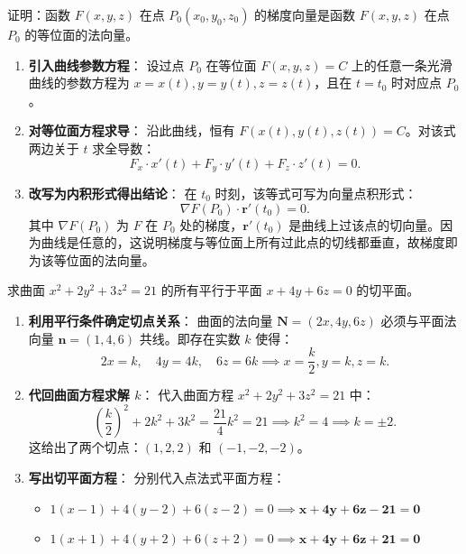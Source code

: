 \documentclass[lang=cn,11pt]{elegantbook}
\begin{document}

\begin{exercise}
证明：函数 $F(x,y,z)$ 在点 $P_0(x_0,y_0,z_0)$ 的梯度向量是函数 $F(x,y,z)$ 在点 $P_0$ 的等位面的法向量。
\end{exercise}

\begin{solution}
\begin{enumerate}
  \item \textbf{引入曲线参数方程}：
  设过点 $P_0$ 在等位面 $F(x,y,z)=C$ 上的任意一条光滑曲线的参数方程为 $x=x(t), y=y(t), z=z(t)$，且在 $t=t_0$ 时对应点 $P_0$。
  \item \textbf{对等位面方程求导}：
  沿此曲线，恒有 $F(x(t), y(t), z(t)) = C$。对该式两边关于 $t$ 求全导数：
  \[
  F_x \cdot x'(t) + F_y \cdot y'(t) + F_z \cdot z'(t) = 0.
  \]
  \item \textbf{改写为内积形式得出结论}：
  在 $t_0$ 时刻，该等式可写为向量点积形式：
  \[
  \nabla F(P_0) \cdot \boldsymbol r'(t_0) = 0.
  \]
  其中 $\nabla F(P_0)$ 为 $F$ 在 $P_0$ 处的梯度，$\boldsymbol r'(t_0)$ 是曲线上过该点的切向量。因为曲线是任意的，这说明梯度与等位面上所有过此点的切线都垂直，故梯度即为该等位面的法向量。
\end{enumerate}
\end{solution}



\begin{exercise}[椭球面的平行切平面族]
求曲面 $x^2+2y^2+3z^2=21$ 的所有平行于平面 $x+4y+6z=0$ 的切平面。
\end{exercise}

\begin{solution}
\begin{enumerate}
  \item \textbf{利用平行条件确定切点关系}：
  曲面的法向量 $\boldsymbol N = (2x, 4y, 6z)$ 必须与平面法向量 $\boldsymbol n = (1, 4, 6)$ 共线。即存在实数 $k$ 使得：
  \[
  2x = k, \quad 4y = 4k, \quad 6z = 6k \implies x = \frac{k}{2}, y = k, z = k.
  \]
  \item \textbf{代回曲面方程求解 $k$}：
  代入曲面方程 $x^2+2y^2+3z^2=21$ 中：
  \[
  \left(\frac{k}{2}\right)^2 + 2k^2 + 3k^2 = \frac{21}{4}k^2 = 21 \implies k^2 = 4 \implies k = \pm 2.
  \]
  这给出了两个切点：$(1,2,2)$ 和 $(-1,-2,-2)$。
  \item \textbf{写出切平面方程}：
  分别代入点法式平面方程：
  \begin{itemize}
    \item $1(x-1) + 4(y-2) + 6(z-2) = 0 \implies \mathbf{x+4y+6z-21=0}$
    \item $1(x+1) + 4(y+2) + 6(z+2) = 0 \implies \mathbf{x+4y+6z+21=0}$
  \end{itemize}
\end{enumerate}
\end{solution}
\end{document}
